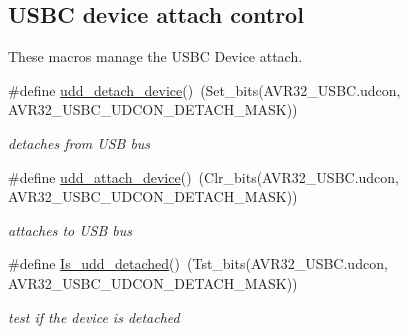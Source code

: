 \subsection*{\-U\-S\-B\-C device attach control}
\label{_amgrp0e11470ac1c73a71585f2d1aea6db499}%
 \-These macros manage the \-U\-S\-B\-C \-Device attach. \begin{DoxyCompactItemize}
\item 
\#define \hyperlink{group__udd__group_ga1863dacf593fb3c1b5f275b48f1e529a}{udd\-\_\-detach\-\_\-device}()~(\-Set\-\_\-bits(\-A\-V\-R32\-\_\-\-U\-S\-B\-C.\-udcon, \-A\-V\-R32\-\_\-\-U\-S\-B\-C\-\_\-\-U\-D\-C\-O\-N\-\_\-\-D\-E\-T\-A\-C\-H\-\_\-\-M\-A\-S\-K))
\begin{DoxyCompactList}\small\item\em detaches from \-U\-S\-B bus \end{DoxyCompactList}\item 
\#define \hyperlink{group__udd__group_ga55686d13fc7b23f4945f527f0dd15906}{udd\-\_\-attach\-\_\-device}()~(\-Clr\-\_\-bits(\-A\-V\-R32\-\_\-\-U\-S\-B\-C.\-udcon, \-A\-V\-R32\-\_\-\-U\-S\-B\-C\-\_\-\-U\-D\-C\-O\-N\-\_\-\-D\-E\-T\-A\-C\-H\-\_\-\-M\-A\-S\-K))
\begin{DoxyCompactList}\small\item\em attaches to \-U\-S\-B bus \end{DoxyCompactList}\item 
\#define \hyperlink{group__udd__group_gaf8c45e04066c136079dd296c2e28bb62}{\-Is\-\_\-udd\-\_\-detached}()~(\-Tst\-\_\-bits(\-A\-V\-R32\-\_\-\-U\-S\-B\-C.\-udcon, \-A\-V\-R32\-\_\-\-U\-S\-B\-C\-\_\-\-U\-D\-C\-O\-N\-\_\-\-D\-E\-T\-A\-C\-H\-\_\-\-M\-A\-S\-K))
\begin{DoxyCompactList}\small\item\em test if the device is detached \end{DoxyCompactList}\end{DoxyCompactItemize}
